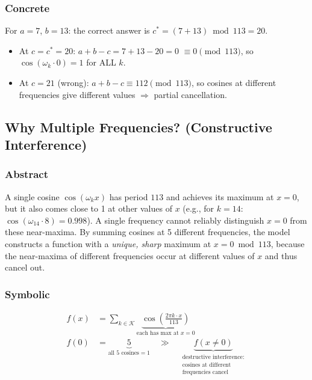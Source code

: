 \documentclass[11pt,a4paper]{article}
\begin{document}
\subsubsection*{Concrete}
For $a = 7$, $b = 13$: the correct answer is $c^* = (7 + 13) \bmod 113 = 20$.

\begin{itemize}
  \item At $c = c^* = 20$: $a + b - c = 7 + 13 - 20 = 0$ $\equiv 0 \pmod{113}$, so $\cos(\omega_k \cdot 0) = 1$ for ALL $k$.
  \item At $c = 21$ (wrong): $a + b - c \equiv 112 \pmod{113}$, so cosines at different frequencies give different values $\Rightarrow$ partial cancellation.
\end{itemize}

\subsection{Why Multiple Frequencies? (Constructive Interference)}

\subsubsection*{Abstract}
A single cosine $\cos(\omega_k x)$ has period $113$ and achieves its maximum at $x = 0$, but it also comes close to 1 at other values of $x$ (e.g., for $k = 14$: $\cos(\omega_{14} \cdot 8) = 0.998$). A single frequency cannot reliably distinguish $x = 0$ from these near-maxima. By summing cosines at 5 different frequencies, the model constructs a function with a \emph{unique, sharp} maximum at $x = 0 \bmod 113$, because the near-maxima of different frequencies occur at different values of $x$ and thus cancel out.

\subsubsection*{Symbolic}
\begin{align}
    f(x) &= \sum_{k \in \mathcal{K}} \underbrace{\cos\!\left(\frac{2\pi k \cdot x}{113}\right)}_{\text{each has max at } x = 0} \\
    f(0) &= \underbrace{5}_{\text{all } 5 \text{ cosines} = 1} \quad \gg \quad \underbrace{f(x \neq 0)}_{\substack{\text{destructive interference:} \\ \text{cosines at different} \\ \text{frequencies cancel}}}
\end{align}
\end{document}
